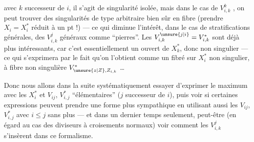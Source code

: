 avec $k$ successeur de $i$, il s'agit de singularité isolée, mais dans le cas de $V_{i,k}^k$ , on peut trouver des singularités de type arbitraire bien sûr en fibre (prendre $X_i=X_i^*$ réduit à un pt !) — ce qui diminue l'intérêt, dans le cas de stratifications  générales, des $V_{i,k}^j$ généraux comme ``pierres''. Les $V_{i,k}^{\unsure{j|i}}=V_{i,k}^*$ sont déjà plus intéressants, car  c'est essentiellement un  ouvert de $X_k^*$, donc non singulier — ce qui s'exprimera par le fait qu'on l'obtient comme un fibré sur $X_i^*$ non singulier, à fibre non singulière $V_{\unsure{z|Z},Z_{i,k}}^*$ \ldots

Donc nous allons dans la suite systématiquement essayer d'exprimer le maximum avec les $X_i^*$ et  $V_{ij}$, $V_{i,j}^*$ ``élémentaires'' ($j$ successeur de $i$), puis voir si certaines expressions peuvent prendre une forme plus sympathique en utilisant aussi  les $V_{ij}$, $V_{i,j}^*$ avec $i\leq j$ sans plus — et dans un dernier temps seulement, peut-être (en égard au cas des diviseurs à croisements normaux) voir comment les $V_{i,k}^j$ s'insèrent dans ce formalisme.
